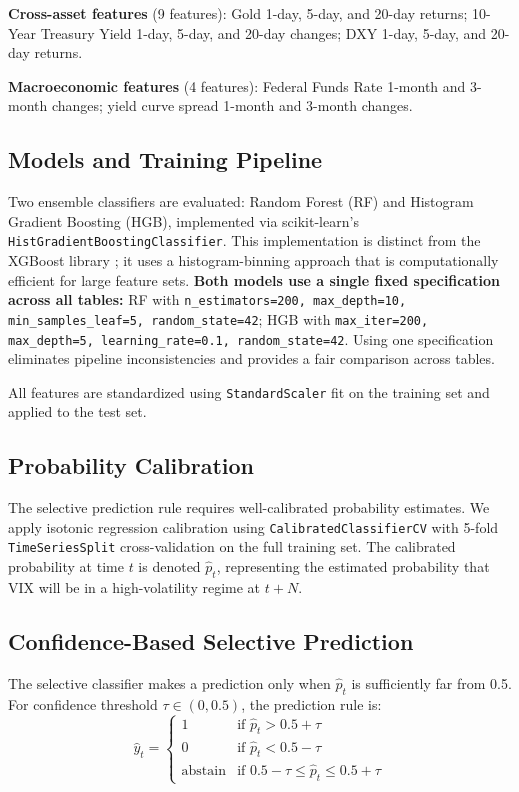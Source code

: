 \documentclass[11pt]{article}
\begin{document}
\textbf{Cross-asset features} (9 features): Gold 1-day, 5-day, and 20-day returns; 10-Year Treasury Yield 1-day, 5-day, and 20-day changes; DXY 1-day, 5-day, and 20-day returns.

\textbf{Macroeconomic features} (4 features): Federal Funds Rate 1-month and 3-month changes; yield curve spread 1-month and 3-month changes.

\subsection{Models and Training Pipeline}

Two ensemble classifiers are evaluated: Random Forest (RF) and Histogram Gradient Boosting (HGB), implemented via scikit-learn's \texttt{HistGradientBoostingClassifier}. This implementation is distinct from the XGBoost library \citep{chen2016}; it uses a histogram-binning approach that is computationally efficient for large feature sets. \textbf{Both models use a single fixed specification across all tables:} RF with \texttt{n\_estimators=200, max\_depth=10, min\_samples\_leaf=5, random\_state=42}; HGB with \texttt{max\_iter=200, max\_depth=5, learning\_rate=0.1, random\_state=42}. Using one specification eliminates pipeline inconsistencies and provides a fair comparison across tables.

All features are standardized using \texttt{StandardScaler} fit on the training set and applied to the test set.

\subsection{Probability Calibration}

The selective prediction rule requires well-calibrated probability estimates. We apply isotonic regression calibration using \texttt{CalibratedClassifierCV} with 5-fold \texttt{TimeSeriesSplit} cross-validation on the full training set. The calibrated probability at time $t$ is denoted $\hat{p}_t$, representing the estimated probability that VIX will be in a high-volatility regime at $t + N$.

\subsection{Confidence-Based Selective Prediction}

The selective classifier makes a prediction only when $\hat{p}_t$ is sufficiently far from 0.5. For confidence threshold $\tau \in (0, 0.5)$, the prediction rule is:
\begin{equation}
    \hat{y}_t = \begin{cases}
        1 & \text{if } \hat{p}_t > 0.5 + \tau \\
        0 & \text{if } \hat{p}_t < 0.5 - \tau \\
        \text{abstain} & \text{if } 0.5 - \tau \leq \hat{p}_t \leq 0.5 + \tau
    \end{cases}
    \label{eq:selective}
\end{equation}
\end{document}
